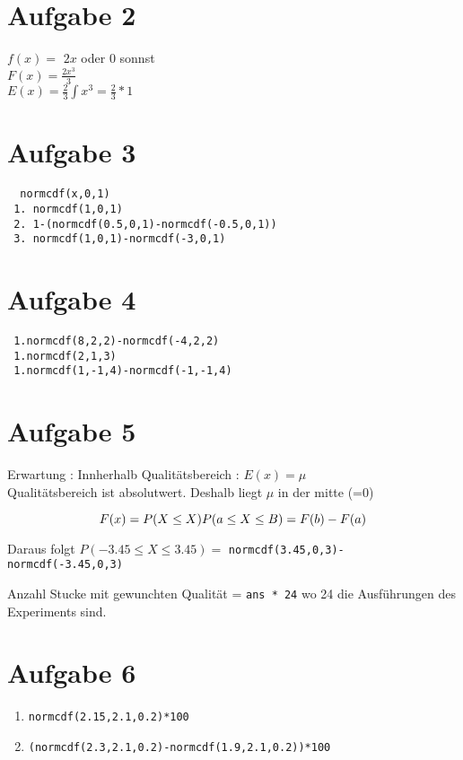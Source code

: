 \documentclass[a4paper,10pt]{scrbook}
\begin{document}
   \section*{Aufgabe 2}
   $f(x) =$ $2x$ oder 0 sonnst \\
   $ F(x) = \frac{2x^3}{3}$ \\
   $E(x) = \frac{2}{3} \int x^3 = \frac{2}{3}*1$
     
\section*{Aufgabe 3}
\begin{verbatim}
  normcdf(x,0,1) 
 1. normcdf(1,0,1)
 2. 1-(normcdf(0.5,0,1)-normcdf(-0.5,0,1))
 3. normcdf(1,0,1)-normcdf(-3,0,1)
\end{verbatim}

\section*{Aufgabe 4}
\begin{verbatim}
 1.normcdf(8,2,2)-normcdf(-4,2,2)
 1.normcdf(2,1,3)
 1.normcdf(1,-1,4)-normcdf(-1,-1,4)
\end{verbatim}

   
\section*{Aufgabe 5}
Erwartung : Innherhalb Qualitätsbereich : 
$E(x) = \mu$ \\
Qualitätsbereich ist absolutwert. Deshalb liegt $\mu$ in der mitte (=0) \\
\begin{framed}
 \begin{equation}
  F(x) = P(X \leq X) \\
  P(a \leq X \leq B) = F(b) - F(a)
 \end{equation}
 
\end{framed}

Daraus folgt $P(-3.45 \leq X \leq 3.45) = $ \texttt{normcdf(3.45,0,3)-normcdf(-3.45,0,3)}

Anzahl Stucke mit gewunchten Qualität = \texttt{ans * 24} wo 24 die Ausführungen des Experiments sind.

\section*{Aufgabe 6}
\begin{enumerate}
 \item \texttt{normcdf(2.15,2.1,0.2)*100}
 \item \texttt{(normcdf(2.3,2.1,0.2)-normcdf(1.9,2.1,0.2))*100}
\end{enumerate}
\end{document}
